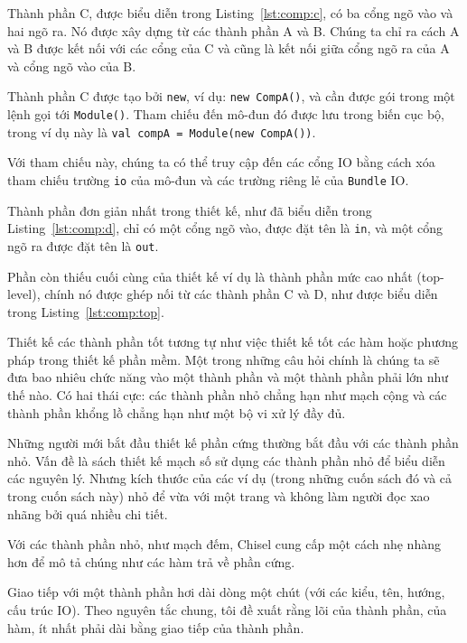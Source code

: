 \documentclass[%
    10pt,
    headinclude, footexclude,
    openright, %
    notitlepage,
    cleardoubleempty,
    headsepline,
    pointlessnumbers,
    bibtotoc, idxtotoc,
    ]{scrbook}
\newcommand{\code}[1]{{\small{\texttt{#1}}}}
\begin{document}
Thành phần C, được biểu diễn trong Listing~\ref{lst:comp:c}, có ba cổng ngõ vào và hai ngõ ra.
Nó được xây dựng từ các thành phần A và B. Chúng ta chỉ ra cách A và B được kết nối với các cổng 
của C và cũng là kết nối giữa cổng ngõ ra của A và cổng ngõ vào của B.



Thành phần C được tạo bởi \code{new}, ví dụ: \code{new CompA()}, và cần được gói trong một lệnh
gọi tới \code{Module()}. Tham chiếu đến mô-đun đó được lưu trong biến cục bộ, trong ví dụ này là \code{val compA = Module(new CompA())}.

Với tham chiếu này, chúng ta có thể truy cập đến các cổng IO bằng cách xóa tham chiếu
trường \code{io} của mô-đun và các trường riêng lẻ của \code{Bundle} IO.

Thành phần đơn giản nhất trong thiết kế, như đã biểu diễn trong Listing~\ref{lst:comp:d},
chỉ có một cổng ngõ vào, được đặt tên là \code{in}, và một cổng ngõ ra được đặt tên là \code{out}.


Phần còn thiếu cuối cùng của thiết kế ví dụ là thành phần mức cao nhất (top-level), chính nó
được ghép nối từ các thành phần C và D, như được biểu diễn trong Listing~\ref{lst:comp:top}.


Thiết kế các thành phần tốt tương tự như việc thiết kế tốt các hàm hoặc phương pháp trong 
thiết kế phần mềm. Một trong những câu hỏi chính là chúng ta sẽ đưa bao nhiêu chức năng vào 
một thành phần và một thành phần phải lớn như thế nào. Có hai thái cực: các thành phần nhỏ chẳng hạn như mạch cộng 
và các thành phần khổng lồ chẳng hạn như một bộ vi xử lý đầy đủ.

Những người mới bắt đầu thiết kế phần cứng thường bắt đầu với các thành phần nhỏ. 
Vấn đề là sách thiết kế mạch số sử dụng các thành phần nhỏ để biểu diễn các nguyên lý. 
Nhưng kích thước của các ví dụ (trong những cuốn sách đó và cả trong cuốn sách này) nhỏ 
để vừa với một trang và không làm người đọc xao nhãng bởi quá nhiều chi tiết.

Với các thành phần nhỏ, như mạch đếm, Chisel cung cấp một cách nhẹ nhàng hơn 
để mô tả chúng như các hàm trả về phần cứng.

Giao tiếp với một thành phần hơi dài dòng một chút (với các kiểu, tên, 
hướng, cấu trúc IO). Theo nguyên tắc chung, tôi đề xuất rằng lõi của thành phần, 
của hàm, ít nhất phải dài bằng giao tiếp của thành phần.
\end{document}
